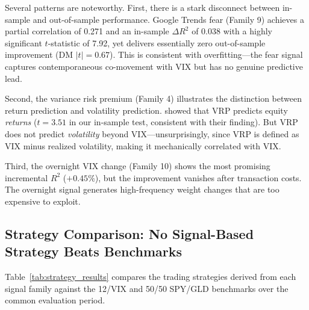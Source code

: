 \documentclass[12pt,a4paper]{article}
\begin{document}
Several patterns are noteworthy. First, there is a stark disconnect between in-sample and out-of-sample performance. Google Trends fear (Family 9) achieves a partial correlation of 0.271 and an in-sample $\Delta R^2$ of 0.038 with a highly significant $t$-statistic of 7.92, yet delivers essentially zero out-of-sample improvement (DM $|t| = 0.67$). This is consistent with overfitting---the fear signal captures contemporaneous co-movement with VIX but has no genuine predictive lead.

Second, the variance risk premium (Family 4) illustrates the distinction between return prediction and volatility prediction. \citet{bollerslev2009} showed that VRP predicts equity \emph{returns} ($t = 3.51$ in our in-sample test, consistent with their finding). But VRP does not predict \emph{volatility} beyond VIX---unsurprisingly, since VRP is defined as VIX minus realized volatility, making it mechanically correlated with VIX.

Third, the overnight VIX change (Family 10) shows the most promising incremental $R^2$ ($+0.45\%$), but the improvement vanishes after transaction costs. The overnight signal generates high-frequency weight changes that are too expensive to exploit.

\subsection{Strategy Comparison: No Signal-Based Strategy Beats Benchmarks}

Table~\ref{tab:strategy_results} compares the trading strategies derived from each signal family against the 12/VIX and 50/50 SPY/GLD benchmarks over the common evaluation period.
\end{document}
